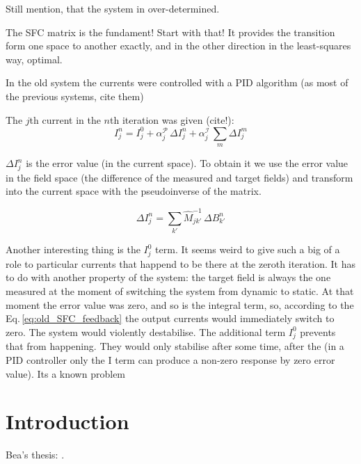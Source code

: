 Still mention, that the system in over-determined.

The SFC matrix is the fundament! Start with that! It provides the transition form one space to another exactly, and in the other direction in the least-squares way, optimal.


In the old system the currents were controlled with a PID algorithm (as most of the previous systems, cite them)

The $j$th current in the $n$th iteration was given (cite!):
\begin{equation}
  \label{eq:old_SFC_feedback}
  I^n_j = I^0_j + \alpha^\mathcal{P}_j \, \Delta I^n_j + \alpha^\mathcal{I}_j \, \sum_m \Delta I^m_j
\end{equation}

$\Delta I^n_j$ is the error value (in the current space). To obtain it we use the error value in the field space (the difference of the measured and target fields) and transform into the current space with the pseudoinverse of the matrix.

\begin{equation}
  \Delta I^n_j = \sum_{k'} \hat{M}^{-1}_{jk'} \, \Delta B^n_{k'}
\end{equation}

Another interesting thing is the $I^0_j$ term. It seems weird to give such a big of a role to particular currents that happend to be there at the zeroth iteration. It has to do with another property of the system: the target field is always the one measured at the moment of switching the system from dynamic to static.
At that moment the error value was zero, and so is the integral term, so, according to the Eq.\,\ref{eq:old_SFC_feedback} the output currents would immediately switch to zero. The system would violently destabilise. The additional term $I^0_j$ prevents that from happening. They would only stabilise after some time, after the (in a PID controller only the I term can produce a non-zero response by zero error value). Its a known problem 





\section{Introduction}
Bea's thesis: \cite{Franke2013}.



